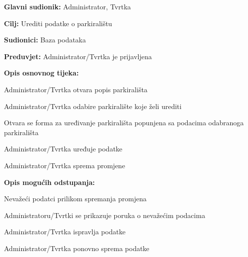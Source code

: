 \noindent {}
\begin{packed_item}
	
	\item \textbf{Glavni sudionik:} Administrator, Tvrtka
	\item \textbf{Cilj:} Urediti podatke o parkiralištu
	\item \textbf{Sudionici:} Baza podataka
	\item \textbf{Preduvjet:} Administrator/Tvrtka je prijavljena
	\item \textbf{Opis osnovnog tijeka:}
	
	\item[] \begin{packed_enum}
		
		\item Administrator/Tvrtka otvara popis parkirališta
		\item Administrator/Tvrtka odabire parkiralište koje želi urediti
		\item Otvara se forma za uređivanje parkirališta popunjena sa podacima odabranoga parkirališta
		\item Administrator/Tvrtka uređuje podatke
		\item Administrator/Tvrtka sprema promjene
	
	\end{packed_enum}
	
	\item  \textbf{Opis mogućih odstupanja:}
	
	\item[] \begin{packed_item}
		
		\item[6.a] Nevažeći podatci prilikom spremanja promjena
		\item[] \begin{packed_enum}
			
			\item Administratoru/Tvrtki se prikazuje poruka o nevažećim podacima
			\item Administrator/Tvrtka ispravlja podatke
			\item Administrator/Tvrtka ponovno sprema podatke
			
		\end{packed_enum}
		
	\end{packed_item}

\end{packed_item}

